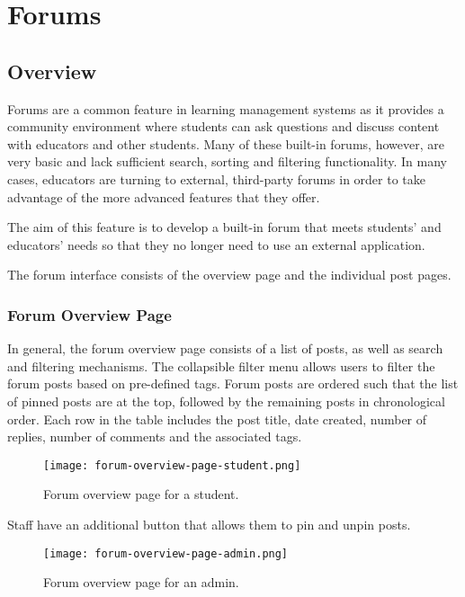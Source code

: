 \section{Forums}
\subsection{Overview}
Forums are a common feature in learning management systems as it provides a community environment where students can ask questions and discuss content with educators and other students.
Many of these built-in forums, however, are very basic and lack sufficient search, sorting and filtering functionality.
In many cases, educators are turning to external, third-party forums in order to take advantage of the more advanced features that they offer.

The aim of this feature is to develop a built-in forum that meets students' and educators' needs so that they no longer need to use an external application.

The forum interface consists of the overview page and the individual post pages.

\subsubsection{Forum Overview Page}

In general, the forum overview page consists of a list of posts, as well as search and filtering mechanisms.
The collapsible filter menu allows users to filter the forum posts based on pre-defined tags.
Forum posts are ordered such that the list of pinned posts are at the top, followed by the remaining posts in chronological order.
Each row in the table includes the post title, date created, number of replies, number of comments and the associated tags.

\begin{figure}[h!]
    \texttt{[image: forum-overview-page-student.png]}
    \centering
    \caption{Forum overview page for a student.}
\end{figure}

\newpage

Staff have an additional button that allows them to pin and unpin posts.

\begin{figure}[h!]
    \texttt{[image: forum-overview-page-admin.png]}
    \centering
    \caption{Forum overview page for an admin.}
\end{figure}

